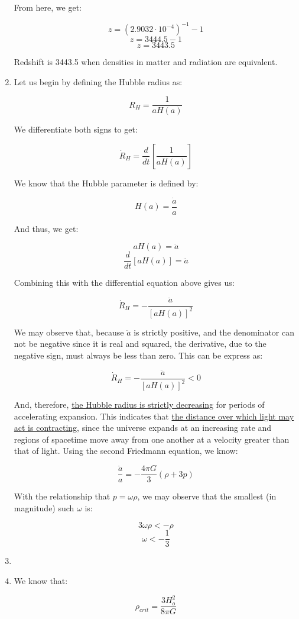\begin{enumerate}
    From here, we get:

    $$z=(2.9032\cdot10^{-4})^{-1}-1$$
    $$z=3444.5-1$$
    $$\boxed{z=3443.5}$$

    Redshift is 3443.5 when densities in matter and radiation are equivalent.

  \item Let us begin by defining the Hubble radius as:

    $$R_H=\frac{1}{aH(a)}$$

    We differentiate both signs to get:

    $$\dot{R}_H=\frac{d}{dt}\left[ \frac{1}{aH(a)} \right]$$

    We know that the Hubble parameter is defined by:

    $$H(a)=\frac{\dot{a}}{a}$$

    And thus, we get:

    $$aH(a)=\dot{a}$$
    $$\frac{d}{dt}[aH(a)]=\ddot{a}$$

    Combining this with the differential equation above gives us:

    $$\dot{R}_H=-\frac{\ddot{a}}{[aH(a)]^2}$$

    We may observe that, because $\ddot{a}$ is strictly positive, and the denominator can not be negative since it is real and squared, the derivative, due to the negative sign, must always be less than zero. This can be express as:

    $$\boxed{\dot{R}_H=-\frac{\ddot{a}}{[aH(a)]^2}<0}$$

    And, therefore, \underline{the Hubble radius is strictly decreasing} for periods of accelerating expansion. This indicates that \underline{the distance over which light may act is contracting}, since the universe expands at an increasing rate and regions of spacetime move away from one another at a velocity greater than that of light. Using the second Friedmann equation, we know:

    $$\frac{\ddot{a}}{a}=-\frac{4\pi G}{3}(\rho +3p)$$

    With the relationship that $p=\omega\rho$, we may observe that the smallest (in magnitude) such $\omega$ is:

    $$3\omega\rho<-\rho$$
    $$\boxed{\omega<-\frac{1}{3}}$$

  \item

  \item We know that:

    $$\rho_{crit}=\frac{3H_o^2}{8\pi G}$$


\end{enumerate}
